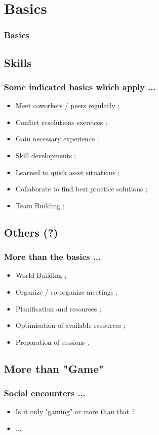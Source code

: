 \documentclass[slidetop,11pt]{beamer}
\begin{document}
\def\sectionIItitle{Basics}
\section{ \sectionIItitle }
\begin{frame}
	\frametitle{ \sectionIItitle }
	\tableofcontents[sections=2,currentsection,subsectionstyle=show/shaded/hide]
\end{frame} 

\subsection{ Skills }
\begin{frame}
	\frametitle{ Some indicated basics which apply ... }
	\begin{itemize}
		\item Meet coworkers / peers regularly ; 
		\item Conflict resolutions exercices ;  
		\item Gain necessary experience ; 
		\item Skill developments ; 
		\item Learned to quick asset situations ; 
		\item Collaborate to find best practice solutions ; 
		\item Team Building ; 
	\end{itemize}
\end{frame}

\subsection{ Others (?) }
\begin{frame}
	\frametitle{ More than the basics ... }
	\begin{itemize}
		\item World Building ; 
		\item Organize / co-organize meetings ; 
		\item Planification and resources ; 
		\item Optimisation of available resources ; 
		\item Preparation of sessions ; 
	\end{itemize}
\end{frame}

\subsection{ More than "Game" }
\begin{frame}
	\frametitle{ Social encounters ... }
	\begin{itemize}
		\item Is it only "gaming" or more than that ?
		\item ... 
	\end{itemize}
\end{frame}
\end{document}
